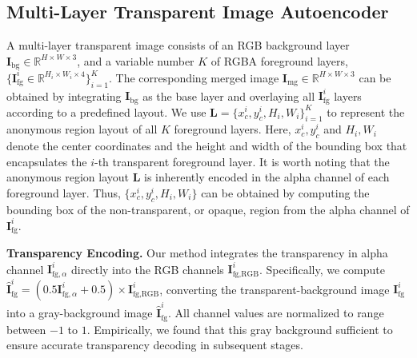 \subsection{Multi-Layer Transparent Image Autoencoder} \label{sec:method:ml_vae}

A multi-layer transparent image consists of an RGB background layer $\mathbf{I}_\text{bg} \in \mathbb{R}^{H \times W \times 3}$, and a variable number $K$ of RGBA foreground layers, $\{\mathbf{I}_\text{fg}^{i} \in \mathbb{R}^{H_i \times W_i \times 4}\}_{i=1}^K$. The corresponding merged image $\mathbf{I}_{\text{mg}} \in \mathbb{R}^{H \times W \times 3}$ can be obtained by integrating $\mathbf{I}_\text{bg}$ as the base layer and overlaying all $\mathbf{I}_\text{fg}^{i}$ layers according to a predefined layout. We use $\mathbf{L}=\{x_c^i, y_c^i, H_i, W_i\}_{i=1}^K$ to represent the anonymous region layout of all $K$ foreground layers. Here, ${x_c^i, y_c^i}$ and ${H_i, W_i}$ denote the center coordinates and the height and width of the bounding box that encapsulates the $i$-th transparent foreground layer. It is worth noting that the anonymous region layout $\mathbf{L}$ is inherently encoded in the alpha channel of each foreground layer. Thus, $\{x_c^i, y_c^i, H_i, W_i\}$ can be obtained by computing the bounding box of the non-transparent, or opaque, region from the alpha channel of $\mathbf{I}_\text{fg}^{i}$.

\vspace{1mm}
\noindent\textbf{Transparency Encoding.}
Our method integrates the transparency in alpha channel $\mathbf{I}_{\text{fg},\alpha}^{i}$ directly into the RGB channels $\mathbf{I}_{\text{fg},\text{RGB}}^{i}$. Specifically, we compute $\hat{\mathbf{I}}_\text{fg}^{i}=(0.5\mathbf{I}_{\text{fg},\alpha}^{i} + 0.5) \times \mathbf{I}_{\text{fg},\text{RGB}}^{i}$, converting the transparent-background image $\mathbf{I}_\text{fg}^{i}$ into a gray-background image $\hat{\mathbf{I}}_\text{fg}^{i}$. All channel values are normalized to range between $-1$ to $1$. Empirically, we found that this gray background sufficient to ensure accurate transparency decoding in subsequent stages.

